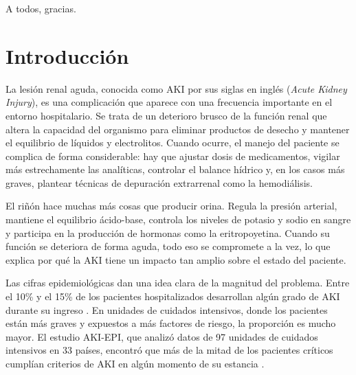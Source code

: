 \documentclass[12pt, a4paper, oneside]{report}
\begin{document}
A todos, gracias.
\clearpage

\tableofcontents
\clearpage

\newpage
\listoffigures
{}

\newpage
\listoftables
{}


\newpage
{}

\chapter{Introducción}
\label{chap:introduccion}

La lesión renal aguda, conocida como AKI por sus siglas en inglés (\textit{Acute Kidney Injury}), es una complicación que aparece con una frecuencia importante en el entorno hospitalario. Se trata de un deterioro brusco de la función renal que altera la capacidad del organismo para eliminar productos de desecho y mantener el equilibrio de líquidos y electrolitos. Cuando ocurre, el manejo del paciente se complica de forma considerable: hay que ajustar dosis de medicamentos, vigilar más estrechamente las analíticas, controlar el balance hídrico y, en los casos más graves, plantear técnicas de depuración extrarrenal como la hemodiálisis.

El riñón hace muchas más cosas que producir orina. Regula la presión arterial, mantiene el equilibrio ácido-base, controla los niveles de potasio y sodio en sangre y participa en la producción de hormonas como la eritropoyetina. Cuando su función se deteriora de forma aguda, todo eso se compromete a la vez, lo que explica por qué la AKI tiene un impacto tan amplio sobre el estado del paciente.

Las cifras epidemiológicas dan una idea clara de la magnitud del problema. Entre el 10\% y el 15\% de los pacientes hospitalizados desarrollan algún grado de AKI durante su ingreso \parencite{hoste2018epidemiology}. En unidades de cuidados intensivos, donde los pacientes están más graves y expuestos a más factores de riesgo, la proporción es mucho mayor. El estudio AKI-EPI, que analizó datos de 97 unidades de cuidados intensivos en 33 países, encontró que más de la mitad de los pacientes críticos cumplían criterios de AKI en algún momento de su estancia \parencite{hoste2015akiepi}.
\end{document}
